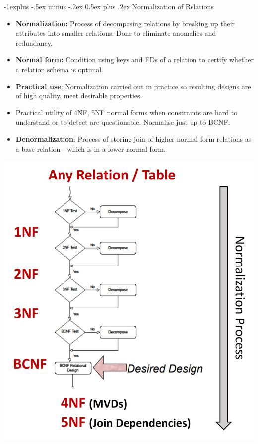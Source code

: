 \documentclass[12pt, landscape]{article}
\makeatletter
\renewcommand{\subsection}{\@startsection{subsection}{2}{0.1mm}%
                                {-1explus -.5ex minus -.2ex}%
                                {0.5ex plus .2ex}%
                                {\normalfont\normalsize\bfseries}}
\makeatother
\begin{document}
\begin{multicols*}{3}
\subsection{Normalization of Relations}
\begin{itemize}
\item \textbf{Normalization:} Process of decomposing relations by breaking up their attributes into smaller relations. Done to eliminate anomalies and redundancy.
\item \textbf{Normal form:} Condition using keys and FDs of a relation to 
certify whether a relation schema is optimal.
\item \textbf{Practical use}: Normalization carried out in practice so resulting designs are of high quality, meet desirable properties. 
\item Practical utility of 4NF, 5NF normal forms when constraints are hard to understand or to detect are questionable. Normalise just up to BCNF.
\item \textbf{Denormalization}: Process of storing join of higher normal form relations as a base relation—which is in a lower normal form.
\end{itemize}
\centerline{\includegraphics[width = 0.6\linewidth]{normalization}}



\end{multicols*}
\end{document}
